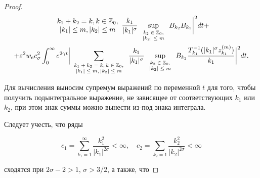 \begin{proof}
\begin{multline}
{\begin{array}{c}
k_1+k_2=k, k\in \mathbb Z_0, \\

|k_1|\le m,|k_2|\le m

\end{array}

}\frac{k_1}{|k_1|^\sigma} \sup_{\scriptsize \begin{array}{c} k_2\in \mathbb Z_0, \\ |k_2|\le m \end{array}} B_{k_2} B_{k_1}\biggr|^2dt+

\\

+ \varepsilon^2 w_e c_\sigma^2\int_0^\infty e^{2\gamma t} 

\biggl|

\sum_{

\scriptsize

\begin{array}{c}

k_1+k_2=k, k\in \mathbb Z_0,\\ 

|k_1|\le m,|k_2|\le m

\end{array}

}\frac{k_1}{|k_1|^\sigma}\sup_{\scriptsize \begin{array}{c} k_2\in \mathbb Z_0, \\ |k_2|\le m \end{array}} B_{k_2}




\frac{T^{-1}_{k_1}(|k_1|^\sigma z_{k_1}^{(m)})}{k_1}\biggr|^2dt.

\end{multline}



Для вычисления выносим супремум выражений по переменной $t$ для того, чтобы получить подынтегральное выражение, не зависящее от соответствующих $k_1$ или $k_2$, при этом знак суммы можно вынести из-под знака интеграла.

Следует учесть, что ряды 

$$

c_{1}=\sum_{k_1=1}^{\infty}\frac{k_1^2}{|k_1|^{2\sigma}}<\infty,\quad 

c_{2}=\sum_{k_2=1}\frac{k_2^2}{|k_2|^{2\sigma}}<\infty  

$$ 

сходятся при $2\sigma-2>1$, $\sigma>3/2$, а также, что


\end{proof}
